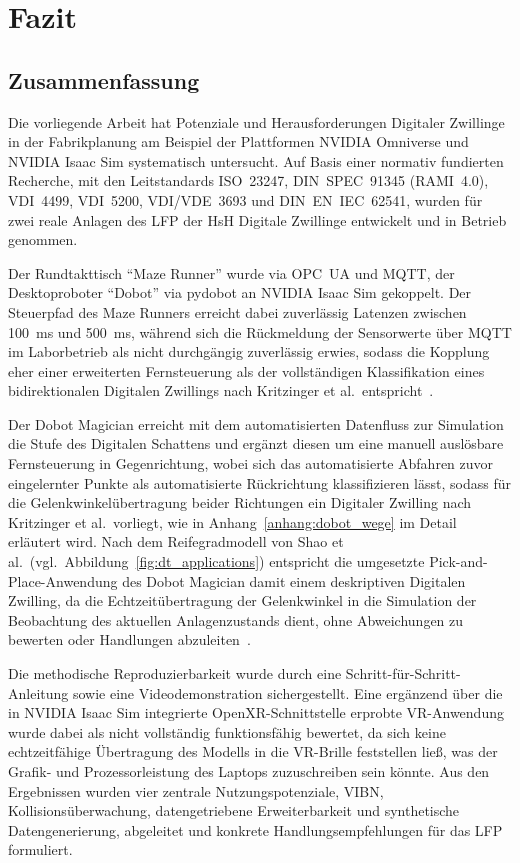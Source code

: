 \section{Fazit}
\label{sec:fazit}

\subsection{Zusammenfassung}
Die vorliegende Arbeit hat Potenziale und Herausforderungen Digitaler Zwillinge in der Fabrikplanung am Beispiel der Plattformen NVIDIA Omniverse und NVIDIA Isaac Sim systematisch untersucht. Auf Basis einer normativ fundierten Recherche, mit den Leitstandards ISO~23247, DIN~SPEC~91345 (RAMI~4.0), VDI~4499, VDI~5200, VDI/VDE~3693 und DIN~EN~IEC~62541, wurden für zwei reale Anlagen des LFP der HsH Digitale Zwillinge entwickelt und in Betrieb genommen.

Der Rundtakttisch \enquote{Maze Runner} wurde via OPC~UA und MQTT, der Desktoproboter \enquote{Dobot} via pydobot an NVIDIA Isaac Sim gekoppelt. Der Steuerpfad des Maze Runners erreicht dabei zuverlässig Latenzen zwischen \SI{100}{\milli\second} und \SI{500}{\milli\second}, während sich die Rückmeldung der Sensorwerte über MQTT im Laborbetrieb als nicht durchgängig zuverlässig erwies, sodass die Kopplung eher einer erweiterten Fernsteuerung als der vollständigen Klassifikation eines bidirektionalen Digitalen Zwillings nach Kritzinger et al.\ entspricht~\cite{kritzinger2018}.

Der Dobot Magician erreicht mit dem automatisierten Datenfluss zur Simulation die Stufe des Digitalen Schattens und ergänzt diesen um eine manuell auslösbare Fernsteuerung in Gegenrichtung, wobei sich das automatisierte Abfahren zuvor eingelernter Punkte als automatisierte Rückrichtung klassifizieren lässt, sodass für die Gelenkwinkelübertragung beider Richtungen ein Digitaler Zwilling nach Kritzinger et al.\ vorliegt, wie in Anhang~\ref{anhang:dobot_wege} im Detail erläutert wird. Nach dem Reifegradmodell von Shao et al.\ (vgl.\ Abbildung~\ref{fig:dt_applications}) entspricht die umgesetzte Pick-and-Place-Anwendung des Dobot Magician damit einem deskriptiven Digitalen Zwilling, da die Echtzeitübertragung der Gelenkwinkel in die Simulation der Beobachtung des aktuellen Anlagenzustands dient, ohne Abweichungen zu bewerten oder Handlungen abzuleiten~\cite{shao2023standardized}.

Die methodische Reproduzierbarkeit wurde durch eine Schritt-für-Schritt-Anleitung sowie eine Videodemonstration sichergestellt. Eine ergänzend über die in NVIDIA Isaac Sim integrierte OpenXR-Schnittstelle erprobte VR-Anwendung wurde dabei als nicht vollständig funktionsfähig bewertet, da sich keine echtzeitfähige Übertragung des Modells in die VR-Brille feststellen ließ, was der Grafik- und Prozessorleistung des Laptops zuzuschreiben sein könnte. Aus den Ergebnissen wurden vier zentrale Nutzungspotenziale, VIBN, Kollisionsüberwachung, datengetriebene Erweiterbarkeit und synthetische Datengenerierung, abgeleitet und konkrete Handlungsempfehlungen für das LFP formuliert.

